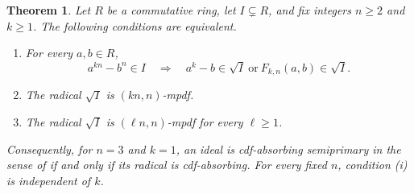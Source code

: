 \documentclass[11pt,a4paper]{amsart}
\newtheorem{theorem}{Theorem}[section]
\theoremstyle{definition}
\theoremstyle{remark}
\numberwithin{equation}{section}
\begin{document}
\begin{theorem}\label{thm:radical-valued}
Let $R$ be a commutative ring, let $I\subsetneq R$, and fix integers
$n\ge2$ and $k\ge1$. The following conditions are equivalent.
\begin{enumerate}
\item For every $a,b\in R$,
\[
 a^{kn}-b^n\in I\quad\Longrightarrow\quad
 a^k-b\in\sqrt I\ \text{or}\ F_{k,n}(a,b)\in\sqrt I.
\]
\item The radical $\sqrt I$ is $(kn,n)$-mpdf.
\item The radical $\sqrt I$ is $(\ell n,n)$-mpdf for every $\ell\ge1$.
\end{enumerate}
Consequently, for $n=3$ and $k=1$, an ideal is cdf-absorbing semiprimary
in the sense of \cite[Definition~2.1]{Dr26} if and only if its radical
is cdf-absorbing. For every fixed $n$, condition (i) is independent of $k$.
\end{theorem}
\end{document}
